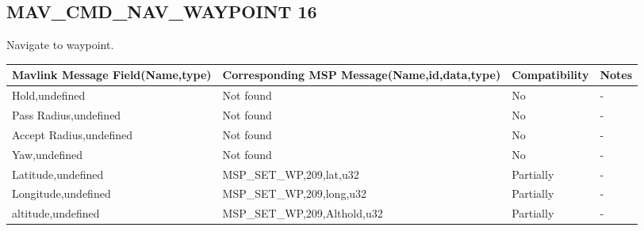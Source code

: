 \subsection{MAV\_CMD\_NAV\_WAYPOINT 16} 
Navigate to waypoint.\\

{
\centering
\begin{tabular}{ |p{4cm  } |p{7cm} | p{2cm}|m{5em}|}
\hline
Mavlink Message Field(Name,type)&Corresponding MSP Message(Name,id,data,type)& Compatibility & Notes\\
\hline
Hold,undefined & Not found & No & - \\
\hline
Pass Radius,undefined & Not found & No & - \\
\hline
Accept Radius,undefined & Not found & No & - \\
\hline
Yaw,undefined & Not found & No & - \\
\hline
\rowcolor{lightgray}
Latitude,undefined & MSP\_SET\_WP,209,lat,u32& Partially & - \\
\hline
\rowcolor{lightgray}
Longitude,undefined & MSP\_SET\_WP,209,long,u32& Partially & - \\
\hline
\rowcolor{lightgray}
altitude,undefined & MSP\_SET\_WP,209,Althold,u32& Partially & - \\
\end{tabular}
}

\cleardoublepage

